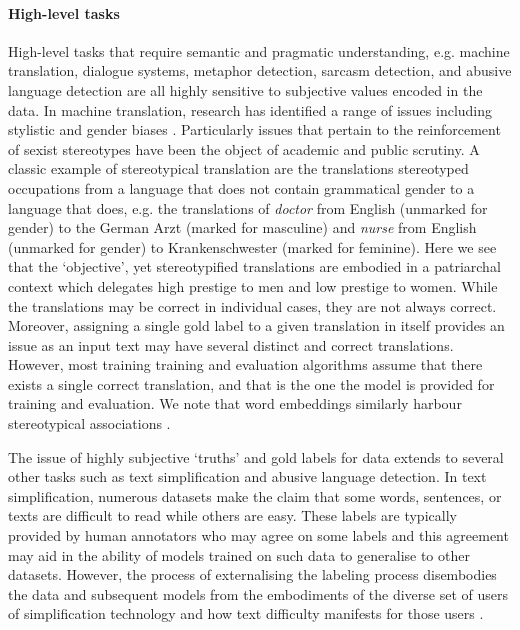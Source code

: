 \paragraph{High-level tasks} High-level tasks that require semantic and pragmatic understanding, e.g. machine translation, dialogue systems, metaphor detection, sarcasm detection, and abusive language detection are all highly sensitive to subjective values encoded in the data. In machine translation, research has identified a range of issues including stylistic \cite{Hovy:2020} and gender biases \cite{Vanmassenhove:2018}. Particularly issues that pertain to the reinforcement of sexist stereotypes have been the object of academic \cite{Escuda:2019} and public \cite{Locklear:2018} scrutiny. A classic example of stereotypical translation are the translations stereotyped occupations from a language that does not contain grammatical gender to a language that does, e.g. the translations of \textit{doctor} from English (unmarked for gender) to the German Arzt (marked for masculine) and \textit{nurse} from English (unmarked for gender) to Krankenschwester (marked for feminine). Here we see that the `objective', yet stereotypified translations are embodied in a patriarchal context which delegates high prestige to men and low prestige to women. While the translations may be correct in individual cases, they are not always correct. Moreover, assigning a single gold label to a given translation in itself provides an issue as an input text may have several distinct and correct translations. However, most training training and evaluation algorithms assume that there exists a single correct translation, and that is the one the model is provided for training and evaluation. We note that word embeddings similarly harbour stereotypical associations \cite{Bolukbasi:2016}.


The issue of highly subjective `truths' and gold labels for data extends to several other tasks such as text simplification and abusive language detection. In text simplification, numerous datasets make the claim that some words, sentences, or texts are difficult to read while others are easy. These labels are typically provided by human annotators who may agree on some labels and this agreement may aid in the ability of models trained on such data to generalise to other datasets. However, the process of externalising the labeling process disembodies the data and subsequent models from the embodiments of the diverse set of users of simplification technology and how text difficulty manifests for those users \cite{Bingel:2018}.

